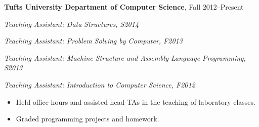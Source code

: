 \vspace{6pt}
{\bf Tufts University Department of Computer Science}, Fall 2012--Present\\
\vspace*{-.15in}
\begin{list1}
\item [] {\em Teaching Assistant: Data Structures, S2014}
\item [] {\em Teaching Assistant: Problem Solving by Computer, F2013}
\item [] {\em Teaching Assistant: Machine Structure and Assembly Language Programming, S2013}
\item [] {\em Teaching Assistant: Introduction to Computer Science, F2012}
\item [] {\begin{itemize}[topsep=0pt,itemsep=-1pt]
    \item Held office hours and assisted head TAs in the teaching of laboratory classes.
    \item Graded programming projects and homework.
\end{itemize}}
\vspace{6pt}

\end{list1}